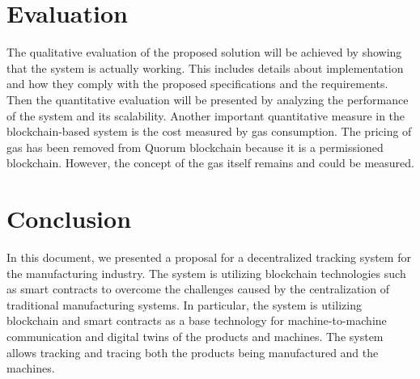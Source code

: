\documentclass[runningheads]{llncs}
\begin{document}
\section{Evaluation}
The qualitative evaluation of the proposed solution will be achieved by showing that the system is actually working. This includes details about implementation and how they comply with the proposed specifications and the requirements. Then the quantitative evaluation will be presented by analyzing the performance of the system and its scalability. Another important quantitative measure in the blockchain-based system is the cost measured by gas consumption. The pricing of gas has been removed from Quorum blockchain because it is a permissioned blockchain. However, the concept of the gas itself remains and could be measured. 

\section{Conclusion}
In this document, we presented a proposal for a decentralized tracking system for the manufacturing industry. The system is utilizing blockchain technologies such as smart contracts to overcome the challenges caused by the centralization of traditional manufacturing systems. In particular, the system is utilizing blockchain and smart contracts as a base technology for machine-to-machine communication and digital twins of the products and machines. The system allows tracking and tracing both the products being manufactured and the machines. 

\newpage


\end{document}
